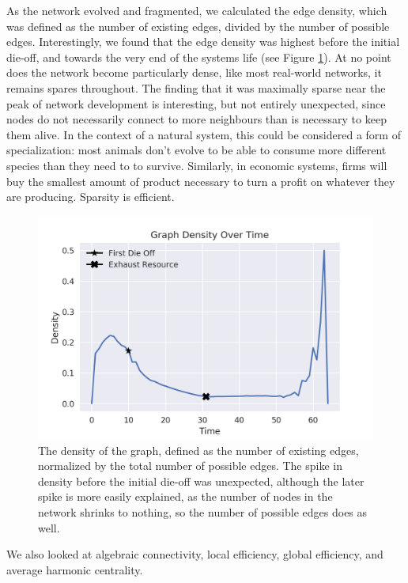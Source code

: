 \documentclass{paper}
\begin{document}
	As the network evolved and fragmented, we calculated the edge density, which was defined as the number of existing edges, divided by the number of possible edges. Interestingly, we found that the edge density was highest before the initial die-off, and towards the very end of the systems life (see Figure \ref{density}). At no point does the network become particularly dense, like most real-world networks, it remains spares throughout. The finding that it was maximally sparse near the peak of network development is interesting, but not entirely unexpected, since nodes do not necessarily connect to more neighbours than is necessary to keep them alive. In the context of a natural system, this could be considered a form of specialization: most animals don't evolve to be able to consume more different species than they need to to survive. Similarly, in economic systems, firms will buy the smallest amount of product necessary to turn a profit on whatever they are producing. Sparsity is efficient. 
	
	\begin{figure}[h]
		\centering
		\includegraphics[scale=0.75]{density.png}
		\caption{The density of the graph, defined as the number of existing edges, normalized by the total number of possible edges. The spike in density before the initial die-off was unexpected, although the later spike is more easily explained, as the number of nodes in the network shrinks to nothing, so the number of possible edges does as well.}
		\label{density}
	\end{figure}
	
	We also looked at algebraic connectivity, local efficiency, global efficiency, and average harmonic centrality. 
	
\end{document}
